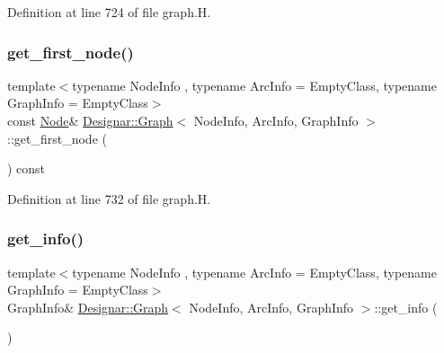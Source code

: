 Definition at line 724 of file graph.\+H.

\mbox{\label{class_designar_1_1_graph_a2c27cdec559e9773deebec6f1af25a99}} 
\subsubsection{\texorpdfstring{get\+\_\+first\+\_\+node()}{get\_first\_node()}\hspace{0.1cm}{\footnotesize\ttfamily [2/2]}}
{\footnotesize\ttfamily template$<$typename Node\+Info , typename Arc\+Info  = Empty\+Class, typename Graph\+Info  = Empty\+Class$>$ \\
const \hyperlink{class_designar_1_1_graph_a5dfc7dba9d092ac489c72e40390c37d0}{Node}\& \hyperlink{class_designar_1_1_graph}{Designar\+::\+Graph}$<$ Node\+Info, Arc\+Info, Graph\+Info $>$\+::get\+\_\+first\+\_\+node (\begin{DoxyParamCaption}{ }\end{DoxyParamCaption}) const\hspace{0.3cm}{\ttfamily [inline]}}



Definition at line 732 of file graph.\+H.

\mbox{\label{class_designar_1_1_graph_a5b84c02e86c7887333df2d8934079678}} 
\subsubsection{\texorpdfstring{get\+\_\+info()}{get\_info()}\hspace{0.1cm}{\footnotesize\ttfamily [1/2]}}
{\footnotesize\ttfamily template$<$typename Node\+Info , typename Arc\+Info  = Empty\+Class, typename Graph\+Info  = Empty\+Class$>$ \\
Graph\+Info\& \hyperlink{class_designar_1_1_graph}{Designar\+::\+Graph}$<$ Node\+Info, Arc\+Info, Graph\+Info $>$\+::get\+\_\+info (\begin{DoxyParamCaption}{ }\end{DoxyParamCaption})\hspace{0.3cm}{\ttfamily [inline]}}



